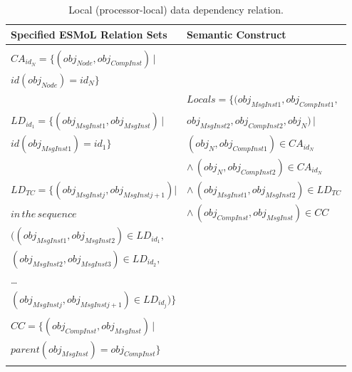 \begin{table}[h]
\centering

\begin{tabular}[width=\columnwidth]{ | l | l | }
 \hline
 \textbf{Specified ESMoL Relation Sets} & \textbf{Semantic
Construct} \\
 \hline \hline
                                                                        & \\
 $CA_{id_N} = \{ (obj_{Node}, obj_{CompInst} ) \, |$                    & \\
 \hspace{1.7cm} $ id(obj_{Node}) = id_N \} $                            & \\
                                                                        & 
$ Locals = \{(obj_{MsgInst1}, obj_{CompInst1}, $  \\
 $LD_{id_1} = \{ (obj_{MsgInst1}, obj_{MsgInst} ) \, |$             & 
\hspace{0.7cm} $obj_{MsgInst2}, obj_{CompInst2}, obj_{N}) \, |$ \\
 \hspace{1.9cm} $id(obj_{MsgInst1}) = id_1 \} $                & 
\hspace{0.5cm} $(obj_{N}, obj_{CompInst1}) \in CA_{id_N}$ \\
                                                                        &  
\hspace{0.2cm} $\wedge \, (obj_{N}, obj_{CompInst2}) \in CA_{id_N}$ \\
 $LD_{TC} = \{ (obj_{MsgInstj}, obj_{MsgInstj+1}) |  $ & 
\hspace{0.2cm} $ \wedge \, (obj_{MsgInst1}, obj_{MsgInst2}) \in LD_{TC}$
\\
 \hspace{0.3cm} $ in \, the \, sequence  $ &
\hspace{0.15cm} $ \wedge \, (obj_{CompInst}, obj_{MsgInst}) \in CC $ \\
 \hspace{0.4cm} $  ( (obj_{MsgInst1}, obj_{MsgInst2}) \in LD_{id_1}, $ &
\\
 \hspace{0.4cm} $ (obj_{MsgInst2}, obj_{MsgInst3}) \in LD_{id_2}, $ & \\
 \hspace{0.7cm} \dots & \\
 \hspace{0.4cm} $ (obj_{MsgInstj}, obj_{MsgInstj+1}) \in LD_{id_j} ) \} $
& \\
 & \\
 $CC = \{ (obj_{CompInst}, obj_{MsgInst} ) \, | $  & \\
 \hspace{0.3cm} $parent(obj_{MsgInst} ) = obj_{CompInst} \}$ & \\
 & \\
 \hline
\end{tabular}
	\caption{Local (processor-local) data dependency relation.}
	\label{tab:localdeps}
\end{table}

